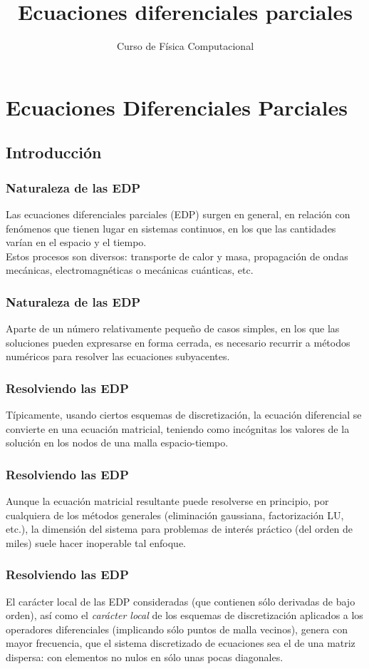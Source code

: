 \documentclass[12pt]{beamer}
\title{Ecuaciones diferenciales parciales}
\subtitle{Curso de Física Computacional}
\begin{document}
\maketitle
\fontsize{14}{14}\selectfont
{}
\section{Ecuaciones Diferenciales Parciales}
\subsection{Introducción}
\begin{frame}
\frametitle{Naturaleza de las EDP}
Las ecuaciones diferenciales parciales (EDP) surgen en general, en relación con fenómenos que tienen lugar en sistemas continuos, en los que las cantidades varían en el espacio y el tiempo.
\\
\bigskip
\pause
Estos procesos son diversos: transporte de calor y masa, propagación de ondas mecánicas, electromagnéticas o mecánicas cuánticas, etc.
\end{frame}
\begin{frame}
\frametitle{Naturaleza de las EDP}
Aparte de un número relativamente pequeño de casos simples, en los que las soluciones pueden expresarse en forma cerrada, es necesario recurrir a métodos numéricos para resolver las ecuaciones subyacentes.
\end{frame}
\begin{frame}
\frametitle{Resolviendo las EDP}
Típicamente, usando ciertos esquemas de discretización, la ecuación diferencial se convierte en una ecuación matricial, teniendo como incógnitas los valores de la solución en los nodos de una malla espacio-tiempo.
\end{frame}
\begin{frame}
\frametitle{Resolviendo las EDP}
Aunque la ecuación matricial resultante puede resolverse en principio, por cualquiera de los métodos generales (eliminación gaussiana, factorización LU, etc.), la dimensión del sistema para problemas de interés práctico (del orden de miles) suele hacer inoperable tal enfoque.
\end{frame}
\begin{frame}
\frametitle{Resolviendo las EDP}
El carácter local de las EDP consideradas (que contienen sólo derivadas de bajo orden), así como el \emph{carácter local} de los esquemas de discretización aplicados a los operadores diferenciales (implicando sólo puntos de malla vecinos), genera con mayor frecuencia, que el sistema discretizado de ecuaciones sea el de una matriz dispersa: con elementos no nulos en sólo unas pocas diagonales.
\end{frame}
\end{document}
